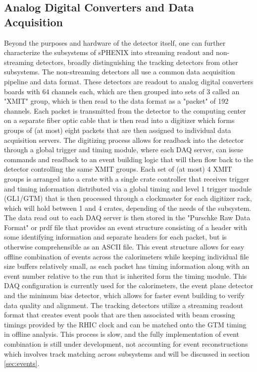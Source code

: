 	\subsection{Analog Digital Converters and Data Acquisition}
		Beyond the purposes and hardware of the detector itself, one can further characterize the subsystems of sPHENIX into streaming readout and non-streaming detectors, broadly distinguishing the tracking detectors from other subsystems. 
		The non-streaming detectors all use a common data acquisition pipeline and data format. 
		These detectors are readout to analog digital converters boards with 64 channels each, which are then grouped into sets of 3 called an "XMIT" group, which is then read to the data format as a "packet" of 192 channels. 
		Each packet is transmitted from the detector to the computing center on a separate fiber optic cable that is then read into a digitizer which forms groups of (at most) eight packets that are then assigned to individual data acquisition servers. 
		The digitizing process allows for readback into the detector through a global trigger and timing module, where each DAQ server, can issue commands and readback to an event building logic that will then flow back to the detector controlling the same XMIT groups. 
		Each set of (at most) 4 XMIT groups is arranged into a crate with a single crate controller that receives trigger and timing information distributed via a global timing and level 1 trigger module (GL1/GTM) that is then processed through a clockmaster for each digitizer rack, which will hold between 1 and 4 crates, depending of the needs of the subsystem. 
		The data read out to each DAQ server is then stored in the "Purschke Raw Data Format" or prdf file that provides an event structure consisting of a header with some identifying information and separate headers for each packet, but is otherwise comprehensible as an ASCII file. 
		This event structure allows for easy offline combination of events across the calorimeters while keeping individual file size buffers relatively small, as each packet has timing information along with an event number relative to the run that is inherited form the timing module. 
		This DAQ configuration is currently used for the calorimeters, the event plane detector and the minimum bias detector, which allows for faster event building to verify data quality and alignment. 
		The tracking detectors utilize a streaming readout format that creates event pools that are then associated with beam crossing timings provided by the RHIC clock and can be matched onto the GTM timing in offline analysis. 
		This process is slow, and the fully implementation of event combination is still under development, not accounting for event reconstructions which involves track matching across subsystems and will be discussed in section \ref{sec:events}.
